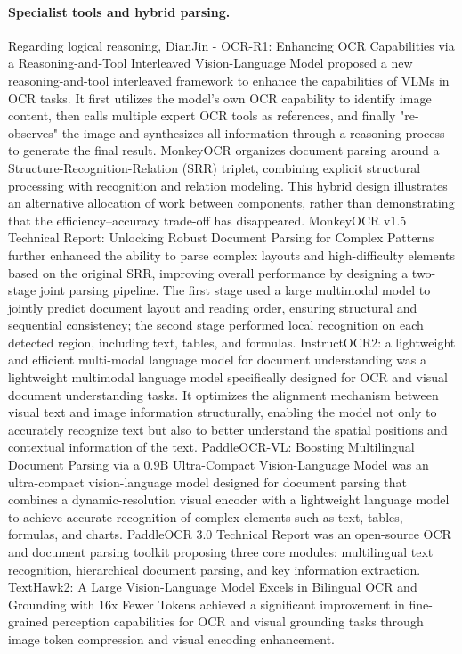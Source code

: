 \paragraph{Specialist tools and hybrid parsing.}
Regarding logical reasoning, DianJin - OCR-R1: Enhancing OCR Capabilities via a Reasoning-and-Tool Interleaved Vision-Language Model \cite{li2025dianjin} proposed a new reasoning-and-tool interleaved framework to enhance the capabilities of VLMs in OCR tasks. It first utilizes the model's own OCR capability to identify image content, then calls multiple expert OCR tools as references, and finally "re-observes" the image and synthesizes all information through a reasoning process to generate the final result. MonkeyOCR \cite{li2025monkeyocr} organizes document parsing around a Structure-Recognition-Relation (SRR) triplet, combining explicit structural processing with recognition and relation modeling. This hybrid design illustrates an alternative allocation of work between components, rather than demonstrating that the efficiency--accuracy trade-off has disappeared. MonkeyOCR v1.5 Technical Report: Unlocking Robust Document Parsing for Complex Patterns \cite{li2025monkeyocr15} further enhanced the ability to parse complex layouts and high-difficulty elements based on the original SRR, improving overall performance by designing a two-stage joint parsing pipeline. The first stage used a large multimodal model to jointly predict document layout and reading order, ensuring structural and sequential consistency; the second stage performed local recognition on each detected region, including text, tables, and formulas. InstructOCR2: a lightweight and efficient multi-modal language model for document understanding \cite{chen2025instructocr2} was a lightweight multimodal language model specifically designed for OCR and visual document understanding tasks. It optimizes the alignment mechanism between visual text and image information structurally, enabling the model not only to accurately recognize text but also to better understand the spatial positions and contextual information of the text. PaddleOCR-VL: Boosting Multilingual Document Parsing via a 0.9B Ultra-Compact Vision-Language Model \cite{du2025paddleocrvl} was an ultra-compact vision-language model designed for document parsing that combines a dynamic-resolution visual encoder with a lightweight language model to achieve accurate recognition of complex elements such as text, tables, formulas, and charts. PaddleOCR 3.0 Technical Report \cite{du2025paddleocr3} was an open-source OCR and document parsing toolkit proposing three core modules: multilingual text recognition, hierarchical document parsing, and key information extraction. TextHawk2: A Large Vision-Language Model Excels in Bilingual OCR and Grounding with 16x Fewer Tokens \cite{zhang2024texthawk2} achieved a significant improvement in fine-grained perception capabilities for OCR and visual grounding tasks through image token compression and visual encoding enhancement.

